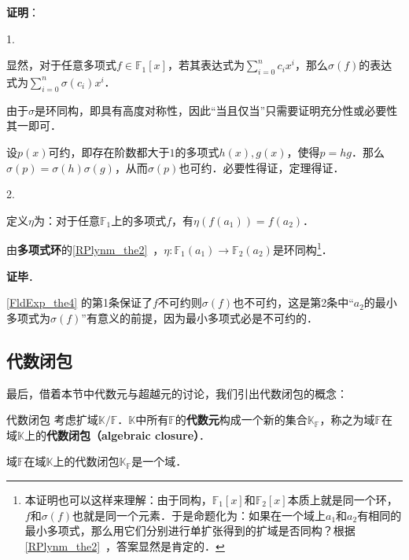 \textbf{证明}：

1. 

显然，对于任意多项式$f\in\mathbb{F}_1[x]$，若其表达式为$\sum_{i=0}^n c_ix^i$，那么$\sigma(f)$的表达式为$\sum_{i=0}^n \sigma(c_i)x^i$．

由于$\sigma$是环同构，即具有高度对称性，因此“当且仅当”只需要证明充分性或必要性其一即可．

设$p(x)$可约，即存在阶数都大于$1$的多项式$h(x),g(x)$，使得$p=hg$．那么$\sigma(p)=\sigma(h)\sigma(g)$，从而$\sigma(p)$也可约．必要性得证，定理得证．

2. 

定义$\eta$为：对于任意$\mathbb{F}_1$上的多项式$f$，有$\eta(f(a_1))=f(a_2)$．

由\textbf{多项式环}的\autoref{RPlynm_the2}~，$\eta:\mathbb{F}_1(a_1)\to \mathbb{F}_2(a_2)$是环同构\footnote{本证明也可以这样来理解：由于同构，$\mathbb{F}_1[x]$和$\mathbb{F}_2[x]$本质上就是同一个环，$f$和$\sigma(f)$也就是同一个元素．于是命题化为：如果在一个域上$a_1$和$a_2$有相同的最小多项式，那么用它们分别进行单扩张得到的扩域是否同构？根据\autoref{RPlynm_the2}~，答案显然是肯定的．}．



\textbf{证毕}．

\autoref{FldExp_the4} 的第1条保证了$f$不可约则$\sigma(f)$也不可约，这是第2条中“$a_2$的最小多项式为$\sigma(f)$”有意义的前提，因为最小多项式必是不可约的．








\subsection{代数闭包}

最后，借着本节中代数元与超越元的讨论，我们引出代数闭包的概念：


\begin{definition}{代数闭包}
考虑扩域$\mathbb{K}/\mathbb{F}$．$\mathbb{K}$中所有$\mathbb{F}$的\textbf{代数元}构成一个新的集合$\mathbb{K}_{\mathbb{F}}$，称之为域$\mathbb{F}$在域$\mathbb{K}$上的\textbf{代数闭包（algebraic closure）}．
\end{definition}

\begin{theorem}{}

域$\mathbb{F}$在域$\mathbb{K}$上的代数闭包$\mathbb{K}_{\mathbb{F}}$是一个域．

\end{theorem}

